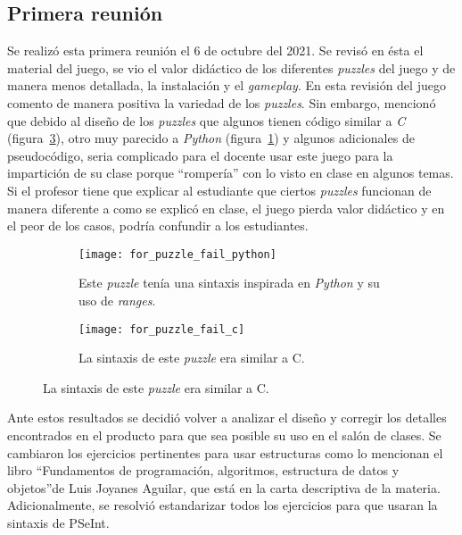 \subsection{Primera reunión}
Se realizó esta primera reunión el 6 de octubre del 2021. Se revisó en ésta el material del juego, se vio el valor didáctico de los diferentes \textit{puzzles} del juego y de manera menos detallada, la instalación y el \textit{gameplay}. En esta revisión del juego comento de manera positiva la variedad de los \textit{puzzles}. Sin embargo, mencionó que debido al diseño de los \textit{puzzles} que algunos tienen código similar a \textit{C} (figura~\ref{fig:for_puzzle_fail_c}), otro muy parecido a \textit{Python} (figura~\ref{fig:for_puzzle_fail_python}) y algunos adicionales de pseudocódigo, seria complicado para el docente usar este juego para la impartición de su clase porque ``rompería'' con lo visto en clase en algunos temas. Si el profesor tiene que explicar al estudiante que ciertos \textit{puzzles} funcionan de manera diferente a como se explicó en clase, el juego pierda valor didáctico y en el peor de los casos, podría confundir a los estudiantes.
\begin{figure}
    \centering
    \begin{subfigure}{0.4\textwidth}
         \centering
         \texttt{[image: for\_puzzle\_fail\_python]}
         \caption{Este \textit{puzzle} tenía una sintaxis inspirada en \textit{Python} y su uso de \textit{ranges}.}
         \label{fig:for_puzzle_fail_python}
     \end{subfigure}
         \begin{subfigure}{0.4\textwidth}
         \centering
         \texttt{[image: for\_puzzle\_fail\_c]}
         \caption{La sintaxis de este \textit{puzzle} era similar a C.}
         \label{fig:for_puzzle_fail_c}
     \end{subfigure}
\end{figure}

Ante estos resultados se decidió volver a analizar el diseño y corregir los detalles encontrados en el producto para que sea posible su uso en el salón de clases. Se cambiaron los ejercicios pertinentes para usar estructuras como lo mencionan el libro \textquotedblleft Fundamentos de programación, algoritmos, estructura de datos y objetos\textquotedblright de Luis Joyanes Aguilar, que está en la carta descriptiva de la materia. Adicionalmente, se resolvió estandarizar todos los ejercicios para que usaran la sintaxis de PSeInt. 

